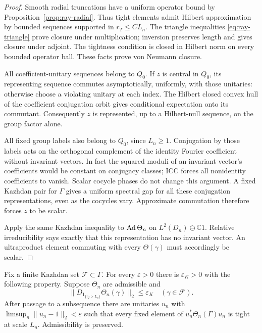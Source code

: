 \begin{proof}
Smooth radial truncations have a uniform operator bound
by Proposition~\ref{prop:ray-radial}.  Thus tight
elements admit Hilbert approximation by bounded sequences
supported in \(r_T\le CL_n\).  The triangle inequalities
\eqref{eq:ray-triangle} prove closure under multiplication;
inversion preserves length and gives closure under adjoint.
The tightness condition is closed in Hilbert norm on every
bounded operator ball.  These facts prove von Neumann
closure.

All coefficient-unitary sequences belong to \(Q_0\).  If
\(z\) is central in \(Q_0\), its representing sequence
commutes asymptotically, uniformly, with those unitaries:
otherwise choose a violating unitary at each index.  The
Hilbert closed convex hull of the coefficient conjugation
orbit gives conditional expectation onto its commutant.
Consequently \(z\) is represented, up to a Hilbert-null
sequence, on the group factor alone.

All fixed group labels also belong to \(Q_0\), since
\(L_n\ge1\).  Conjugation by those labels acts on the
orthogonal complement of the identity Fourier coefficient
without invariant vectors.  In fact the squared moduli of
an invariant vector's coefficients would be constant on
conjugacy classes; ICC forces all nonidentity coefficients
to vanish.  Scalar cocycle phases do not change this
argument.  A fixed Kazhdan pair for \(\Gamma\) gives a
uniform spectral gap for all these conjugation
representations, even as the cocycles vary.  Approximate
commutation therefore forces \(z\) to be scalar.

Apply the same Kazhdan inequality to
\(\operatorname{Ad}\Theta_n\) on \(L^2(D_n)\ominus\mathbb C1\).
Relative irreducibility says exactly that this representation
has no invariant vector.  An ultraproduct element commuting
with every \(\Theta(\gamma)\) must accordingly be scalar.
\end{proof}

\begin{lemma}\label{lem:scale-tightening}
Fix a finite Kazhdan set \(\mathcal F\subset\Gamma\).
For every \(\varepsilon>0\) there is
\(\varepsilon_K>0\) with the following property.
Suppose \(\Theta_n\) are admissible and
\begin{equation}
 \|D_{1_{\{r_T>L_n\}}}\Theta_n(\gamma)\|_2
 \le\varepsilon_K
 \quad(\gamma\in\mathcal F).
 \label{eq:scale-kazhdan-window}
\end{equation}
After passage to a subsequence there are unitaries \(u_n\)
with \(\limsup_n\|u_n-1\|_2<\varepsilon\) such that every
fixed element of \(u_n^*\Theta_n(\Gamma)u_n\) is tight at
scale \(L_n\).  Admissibility is preserved.
\end{lemma}

